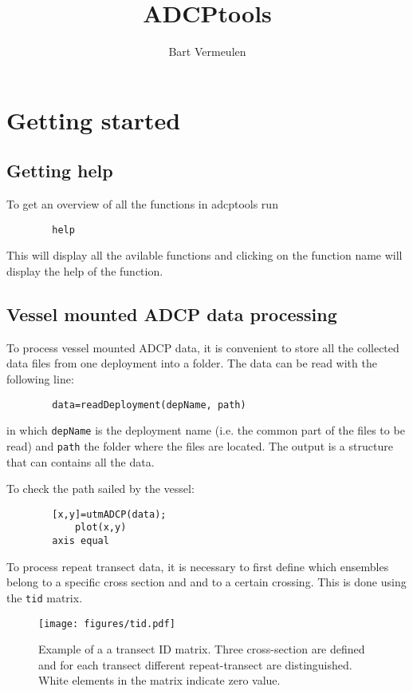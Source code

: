 \documentclass{book}
\author{Bart Vermeulen}
\title{ADCPtools}
\begin{document}
	\maketitle
	\chapter{Getting started}
	\section{Getting help}
	To get an overview of all the functions in adcptools run
	\begin{lstlisting}
		help 
	\end{lstlisting}
	This will display all the avilable functions and clicking on the function name will display the help of the function.

	\section{Vessel mounted ADCP data processing}
	To process vessel mounted ADCP data, it is convenient to store all the collected data files from one deployment into a folder.
	The data can be read with the following line:
	\begin{lstlisting}
		data=readDeployment(depName, path)
	\end{lstlisting}
	in which \lstinline{depName} is the deployment name (i.e. the common part of the files to be read) and \lstinline{path} the folder where the files are located.
	The output is a structure that can contains all the data.

	To check the path sailed by the vessel:
	\begin{lstlisting}
		[x,y]=utmADCP(data);
	      	plot(x,y)
		axis equal
	\end{lstlisting}

	To process repeat transect data, it is necessary to first define which ensembles belong to a specific cross section and and to a certain crossing. This is done using the \lstinline{tid} matrix.
	\begin{figure}
		\texttt{[image: figures/tid.pdf]}
		\caption{Example of a a transect ID matrix. Three cross-section are defined and for each transect different repeat-transect are distinguished. White elements in the matrix indicate zero value.}
		\label{fig:tid}
	\end{figure}
%
%
%
%
%
\end{document}

